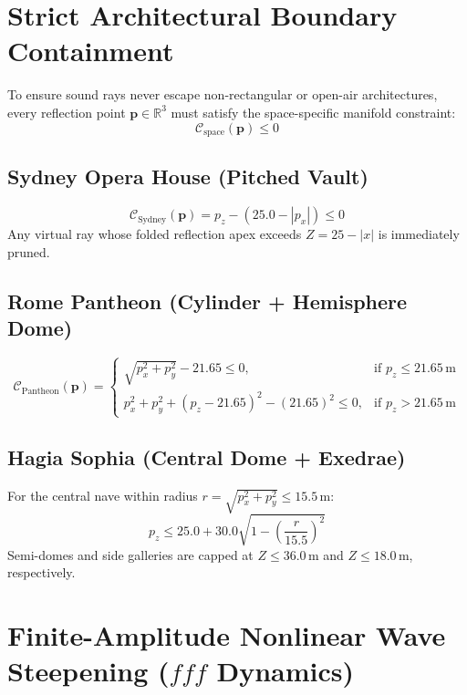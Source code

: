\documentclass[11pt,a4paper]{article}
\begin{document}
\section{Strict Architectural Boundary Containment}

To ensure sound rays never escape non-rectangular or open-air architectures, every reflection point $\mathbf{p} \in \mathbb{R}^3$ must satisfy the space-specific manifold constraint:
\begin{equation}
\mathcal{C}_{\text{space}}(\mathbf{p}) \le 0
\end{equation}

\subsection{Sydney Opera House (Pitched Vault)}
\begin{equation}
\mathcal{C}_{\text{Sydney}}(\mathbf{p}) = p_z - \left(25.0 - |p_x|\right) \le 0
\end{equation}
Any virtual ray whose folded reflection apex exceeds $Z = 25 - |x|$ is immediately pruned.

\subsection{Rome Pantheon (Cylinder + Hemisphere Dome)}
\begin{equation}
\mathcal{C}_{\text{Pantheon}}(\mathbf{p}) = \begin{cases}
\sqrt{p_x^2 + p_y^2} - 21.65 \le 0, & \text{if } p_z \le 21.65\,\text{m} \\
p_x^2 + p_y^2 + (p_z - 21.65)^2 - (21.65)^2 \le 0, & \text{if } p_z > 21.65\,\text{m}
\end{cases}
\end{equation}

\subsection{Hagia Sophia (Central Dome + Exedrae)}
For the central nave within radius $r = \sqrt{p_x^2 + p_y^2} \le 15.5\,\text{m}$:
\begin{equation}
p_z \le 25.0 + 30.0 \sqrt{1 - \left(\frac{r}{15.5}\right)^2}
\end{equation}
Semi-domes and side galleries are capped at $Z \le 36.0\,\text{m}$ and $Z \le 18.0\,\text{m}$, respectively.

\section{Finite-Amplitude Nonlinear Wave Steepening ($fff$ Dynamics)}
\end{document}
